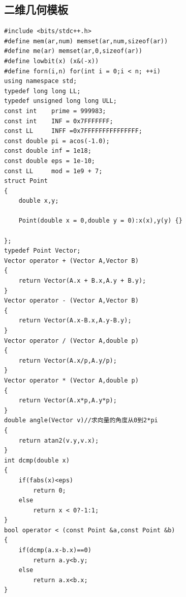 \documentclass[twoside]{article}
\begin{document}
\subsection{二维几何模板}
\begin{lstlisting}
#include <bits/stdc++.h>
#define mem(ar,num) memset(ar,num,sizeof(ar))
#define me(ar) memset(ar,0,sizeof(ar))
#define lowbit(x) (x&(-x))
#define forn(i,n) for(int i = 0;i < n; ++i)
using namespace std;
typedef long long LL;
typedef unsigned long long ULL;
const int    prime = 999983;
const int    INF = 0x7FFFFFFF;
const LL     INFF =0x7FFFFFFFFFFFFFFF;
const double pi = acos(-1.0);
const double inf = 1e18;
const double eps = 1e-10;
const LL     mod = 1e9 + 7;
struct Point
{
    double x,y;

    Point(double x = 0,double y = 0):x(x),y(y) {}

};
typedef Point Vector;
Vector operator + (Vector A,Vector B)
{
    return Vector(A.x + B.x,A.y + B.y);
}
Vector operator - (Vector A,Vector B)
{
    return Vector(A.x-B.x,A.y-B.y);
}
Vector operator / (Vector A,double p)
{
    return Vector(A.x/p,A.y/p);
}
Vector operator * (Vector A,double p)
{
    return Vector(A.x*p,A.y*p);
}
double angle(Vector v)//求向量的角度从0到2*pi
{
    return atan2(v.y,v.x);
}
int dcmp(double x)
{
    if(fabs(x)<eps)
        return 0;
    else
        return x < 0?-1:1;
}
bool operator < (const Point &a,const Point &b)
{
    if(dcmp(a.x-b.x)==0)
        return a.y<b.y;
    else
        return a.x<b.x;
}



\end{lstlisting}
\end{document}
